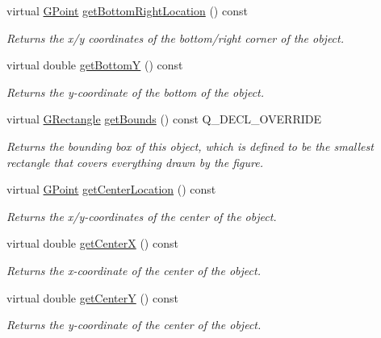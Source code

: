 \begin{DoxyCompactItemize}
virtual \mbox{\hyperlink{classGPoint}{G\+Point}} \mbox{\hyperlink{classGObject_a0d41183bf6b08de66fe3907551aab0d7}{get\+Bottom\+Right\+Location}} () const
\begin{DoxyCompactList}\small\item\em Returns the x/y coordinates of the bottom/right corner of the object. \end{DoxyCompactList}\item 
virtual double \mbox{\hyperlink{classGObject_a4316a2406c18e1c6d061fe51fd355490}{get\+BottomY}} () const
\begin{DoxyCompactList}\small\item\em Returns the {\itshape y}-\/coordinate of the bottom of the object. \end{DoxyCompactList}\item 
virtual \mbox{\hyperlink{classGRectangle}{G\+Rectangle}} \mbox{\hyperlink{classGCompound_a2f46ec8a3b533c690b3b3e56d4f34afe}{get\+Bounds}} () const Q\+\_\+\+D\+E\+C\+L\+\_\+\+O\+V\+E\+R\+R\+I\+DE
\begin{DoxyCompactList}\small\item\em Returns the bounding box of this object, which is defined to be the smallest rectangle that covers everything drawn by the figure. \end{DoxyCompactList}\item 
virtual \mbox{\hyperlink{classGPoint}{G\+Point}} \mbox{\hyperlink{classGObject_a0909472e91448470bccdb62ecfb95d8b}{get\+Center\+Location}} () const
\begin{DoxyCompactList}\small\item\em Returns the x/y-\/coordinates of the center of the object. \end{DoxyCompactList}\item 
virtual double \mbox{\hyperlink{classGObject_a04df74355b545e0543112d5b8d924176}{get\+CenterX}} () const
\begin{DoxyCompactList}\small\item\em Returns the {\itshape x}-\/coordinate of the center of the object. \end{DoxyCompactList}\item 
virtual double \mbox{\hyperlink{classGObject_acb3287a3d507025a26f54b895713b947}{get\+CenterY}} () const
\begin{DoxyCompactList}\small\item\em Returns the {\itshape y}-\/coordinate of the center of the object. \end{DoxyCompactList}\item 

\end{DoxyCompactItemize}
